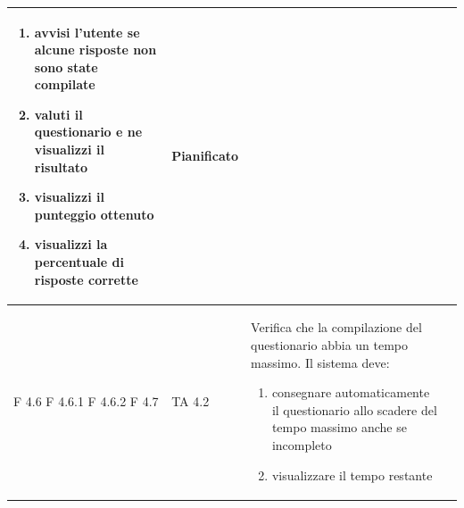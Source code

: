 \documentclass[a4paper,11pt]{article}
\begin{document}
\begin{longtable}{p{}p{}p{}p{}}
\begin{enumerate}
\item avvisi l'utente se alcune risposte non sono state compilate
\item valuti il questionario e ne visualizzi il risultato
\item visualizzi il punteggio ottenuto
\item visualizzi la percentuale di risposte corrette 
\end{enumerate} & Pianificato\\
\midrule

F 4.6 \newline F 4.6.1 \newline F 4.6.2 \newline F 4.7& TA 4.2&Verifica che la compilazione del questionario abbia un tempo massimo. \newline
Il sistema deve:
\begin{enumerate}
\item consegnare automaticamente il questionario allo scadere del tempo massimo anche se incompleto
\item visualizzare il tempo restante


\end{enumerate}
\end{longtable}
\end{document}
